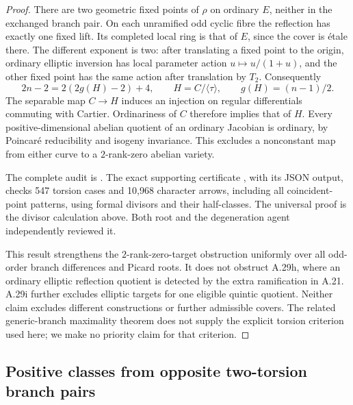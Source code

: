 \begin{proof}
There are two geometric fixed points of $\rho$ on
ordinary $E$, neither in the exchanged branch pair.
On each unramified odd cyclic fibre the reflection
has exactly one fixed lift. Its completed local ring
is that of $E$, since the cover is \'etale there.
The different exponent is two: after translating a
fixed point to the origin, ordinary elliptic inversion
has local parameter action $u\mapsto u/(1+u)$, and
the other fixed point has the same action after
translation by $T_2$. Consequently
\[
 2n-2=2(2g(H)-2)+4,
 \qquad H=C/\langle\tau\rangle,
 \qquad g(H)=(n-1)/2.
\]
The separable map $C\to H$ induces an injection on
regular differentials commuting with Cartier.
Ordinariness of $C$ therefore implies that of $H$.
Every positive-dimensional abelian quotient of an
ordinary Jacobian is ordinary, by Poincar\'e
reducibility and isogeny invariance. This excludes
a nonconstant map from either curve to a
$2$-rank-zero abelian variety.

The complete audit is
.
The exact supporting certificate
, with
its JSON output, checks 547 torsion cases and 10,968
character arrows, including all coincident-point
patterns, using formal divisors and their half-classes.
The universal proof is the divisor calculation above.
Both root and the degeneration agent independently
reviewed it.

This result strengthens the $2$-rank-zero-target
obstruction uniformly over all odd-order branch
differences and Picard roots. It does not obstruct
A.29h, where an ordinary elliptic reflection quotient
is detected by the extra ramification in A.21.
A.29i further excludes elliptic targets for one
eligible quintic quotient. Neither claim excludes
different constructions or further admissible covers.
The related generic-branch maximality theorem
\citep[Proposition 8.1 and Corollary 8.2]{A_Bouw2001}
does not supply the explicit torsion criterion used
here; we make no priority claim for that criterion.
\end{proof}

\subsection{Positive classes from opposite two-torsion branch pairs}

